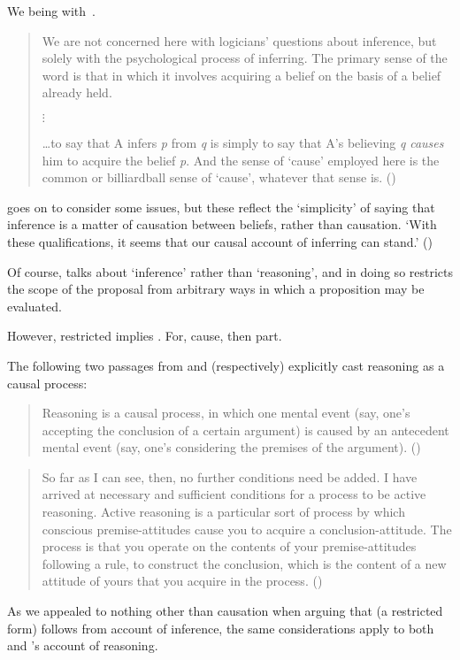 \begin{note}
  We being with~\cite{Armstrong:1968vh}.
  \begin{quote}
    We are not concerned here with logicians' questions about inference, but solely with the psychological process of inferring.
    The primary sense of the word is that in which it involves acquiring a belief on the basis of a belief already held.

    \mbox{}\hfill\(\vdots\)\hfill\mbox{}

    \dots to say that A infers \emph{p} from \emph{q} is simply to say that A's believing \emph{q} \emph{causes} him to acquire the belief \emph{p}.
    And the sense of `cause' employed here is the common or billiardball sense of `cause', whatever that sense is.\nolinebreak
    \mbox{}\hfill\mbox{(\citeyear[194]{Armstrong:1968vh})}
  \end{quote}
  \cite{Armstrong:1968vh} goes on to consider some issues, but these reflect the `simplicity' of saying that inference is a matter of causation between beliefs, rather than causation.
  `With these qualifications, it seems that our causal account of inferring can stand.'
  (\citeyear[197]{Armstrong:1968vh})

  Of course, \citeauthor{Armstrong:1968vh} talks about `inference' rather than `reasoning', and in doing so restricts the scope of the proposal from arbitrary ways in which a proposition may be evaluated.

  However, restricted implies \ESU{}.
  For, cause, then part.
\end{note}

\begin{note}
  The following two passages from \citeauthor{Wedgwood:2006ui} and \citeauthor{Broome:2013aa} (respectively) explicitly cast reasoning as a causal process:

  \begin{quote}
    Reasoning is a causal process, in which one mental event (say, one's accepting the conclusion of a certain argument) is caused by an antecedent mental event (say, one's considering the premises of the argument).\nolinebreak
    \mbox{}\hfill\mbox{(\cite[660]{Wedgwood:2006ui})}
  \end{quote}

  \begin{quote}
    So far as I can see, then, no further conditions need be added.
    I have arrived at necessary and sufficient conditions for a process to be active reasoning.
    Active reasoning is a particular sort of process by which conscious premise-attitudes cause you to acquire a conclusion-attitude.
    The process is that you operate on the contents of your premise-attitudes following a rule, to construct the conclusion, which is the content of a new attitude of yours that you acquire in the process.\nolinebreak
    \mbox{}\hfill\mbox{(\cite[234]{Broome:2013aa})}
  \end{quote}
  As we appealed to nothing other than causation when arguing that (a restricted form) \ESU{} follows from \citeauthor{Armstrong:1968vh} account of inference, the same considerations apply to both \citeauthor{Wedgwood:2006ui} and \citeauthor{Broome:2013aa}'s account of reasoning.
\end{note}


